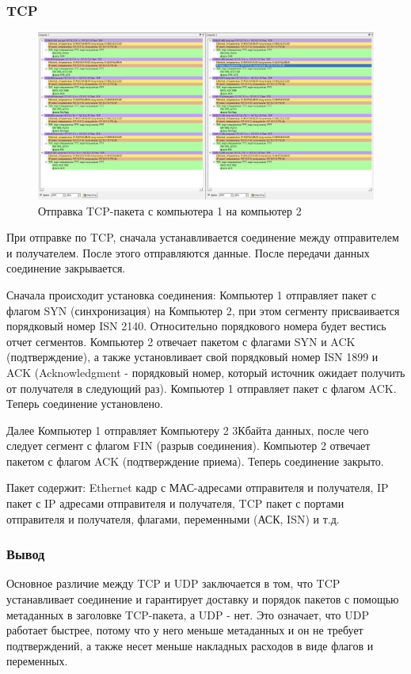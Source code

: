 \documentclass[12pt,onecolumn]{article}
\begin{document}
\subsubsection{TCP}
\begin{figure}[H]
  \centering
  \includegraphics[width=\textwidth]{image/part1/tcp.png}
  \caption{Отправка TCP-пакета с компьютера 1 на компьютер 2}
\end{figure}

При отправке по TCP, сначала устанавливается соединение между отправителем и получателем. После этого отправляются данные. После передачи данных соединение закрывается.

Сначала происходит установка соединения: Компьютер 1 отправляет пакет с флагом SYN (синхронизация) на Компьютер 2, при этом сегменту присваивается порядковый номер ISN 2140. Относительно порядкового номера будет вестись отчет сегментов. Компьютер 2 отвечает пакетом с флагами SYN и ACK (подтверждение), а также установливает свой порядковый номер ISN 1899 и ACK (Acknowledgment - порядковый номер, который источник ожидает получить от получателя в следующий раз). Компьютер 1 отправляет пакет с флагом ACK. Теперь соединение установлено.

Далее Компьютер 1 отправляет Компьютеру 2 3Кбайта данных, после чего следует сегмент с флагом FIN (разрыв соединения). Компьютер 2 отвечает пакетом с флагом ACK (подтверждение приема). Теперь соединение закрыто.

Пакет содержит: Ethernet кадр с МАС-адресами
отправителя и получателя, IP пакет с IP адресами отправителя и получателя,
TCP пакет с портами отправителя и получателя, флагами, переменными (АСК,
ISN) и т.д.
\subsubsection{Вывод}

Основное различие между TCP и UDP заключается в том, что TCP устанавливает соединение и гарантирует доставку и порядок пакетов с помощью метаданных в заголовке TCP-пакета, а UDP - нет. Это означает, что UDP работает быстрее, потому что у него меньше метаданных и он не требует подтверждений, а также несет меньше накладных расходов в виде флагов и переменных.
\end{document}
